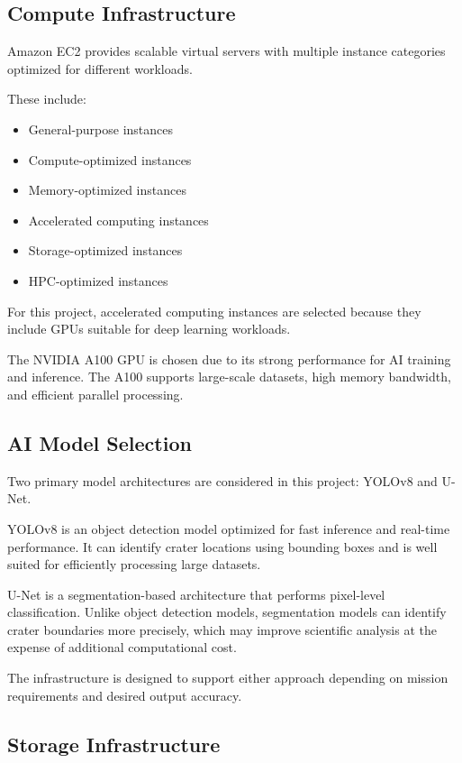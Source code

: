 \documentclass[conference]{IEEEtran}
\begin{document}
	\subsection{Compute Infrastructure}
	
	Amazon EC2 provides scalable virtual servers with multiple instance categories optimized for different workloads.
	
	These include:
	\begin{itemize}
		\item General-purpose instances
		\item Compute-optimized instances
		\item Memory-optimized instances
		\item Accelerated computing instances
		\item Storage-optimized instances
		\item HPC-optimized instances
	\end{itemize}
	
	For this project, accelerated computing instances are selected because they include GPUs suitable for deep learning workloads.
	
	The NVIDIA A100 GPU is chosen due to its strong performance for AI training and inference. The A100 supports large-scale datasets, high memory bandwidth, and efficient parallel processing.
	
	\subsection{AI Model Selection}
	
	Two primary model architectures are considered in this project: YOLOv8 and U-Net.
	
	YOLOv8 is an object detection model optimized for fast inference and real-time performance. It can identify crater locations using bounding boxes and is well suited for efficiently processing large datasets.
	
	U-Net is a segmentation-based architecture that performs pixel-level classification. Unlike object detection models, segmentation models can identify crater boundaries more precisely, which may improve scientific analysis at the expense of additional computational cost.
	
	The infrastructure is designed to support either approach depending on mission requirements and desired output accuracy.
	
	\subsection{Storage Infrastructure}
	
\end{document}
